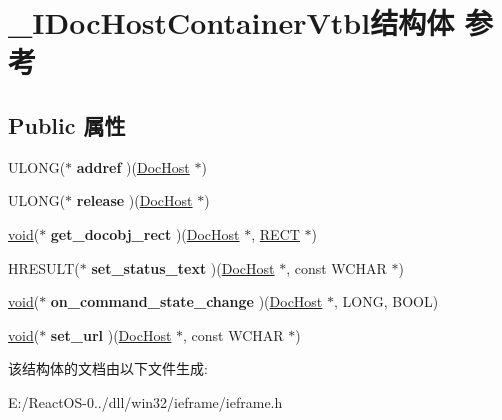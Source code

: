 \hypertarget{struct___i_doc_host_container_vtbl}{}\section{\+\_\+\+I\+Doc\+Host\+Container\+Vtbl结构体 参考}
\label{struct___i_doc_host_container_vtbl}
\subsection*{Public 属性}
\begin{DoxyCompactItemize}
\item 
\mbox{\label{struct___i_doc_host_container_vtbl_af999ad8ed0fa44a79a4b2dbe8b380e66}} 
U\+L\+O\+NG($\ast$ {\bfseries addref} )(\hyperlink{struct_doc_host}{Doc\+Host} $\ast$)
\item 
\mbox{\label{struct___i_doc_host_container_vtbl_abba6e2aa501766f5685390aa39591d0a}} 
U\+L\+O\+NG($\ast$ {\bfseries release} )(\hyperlink{struct_doc_host}{Doc\+Host} $\ast$)
\item 
\mbox{\label{struct___i_doc_host_container_vtbl_a042396d570ea46627b1052664aa86fd5}} 
\hyperlink{interfacevoid}{void}($\ast$ {\bfseries get\+\_\+docobj\+\_\+rect} )(\hyperlink{struct_doc_host}{Doc\+Host} $\ast$, \hyperlink{structtag_r_e_c_t}{R\+E\+CT} $\ast$)
\item 
\mbox{\label{struct___i_doc_host_container_vtbl_a2f8af3946f87dbd04088101cd2861538}} 
H\+R\+E\+S\+U\+LT($\ast$ {\bfseries set\+\_\+status\+\_\+text} )(\hyperlink{struct_doc_host}{Doc\+Host} $\ast$, const W\+C\+H\+AR $\ast$)
\item 
\mbox{\label{struct___i_doc_host_container_vtbl_ac196a69a2888dfc03349bb5e3af30943}} 
\hyperlink{interfacevoid}{void}($\ast$ {\bfseries on\+\_\+command\+\_\+state\+\_\+change} )(\hyperlink{struct_doc_host}{Doc\+Host} $\ast$, L\+O\+NG, B\+O\+OL)
\item 
\mbox{\label{struct___i_doc_host_container_vtbl_a94e78aa10175a1cfa3e58c1680a13247}} 
\hyperlink{interfacevoid}{void}($\ast$ {\bfseries set\+\_\+url} )(\hyperlink{struct_doc_host}{Doc\+Host} $\ast$, const W\+C\+H\+AR $\ast$)
\end{DoxyCompactItemize}


该结构体的文档由以下文件生成\+:\begin{DoxyCompactItemize}
\item 
E\+:/\+React\+O\+S-\/0../dll/win32/ieframe/ieframe.\+h\end{DoxyCompactItemize}
